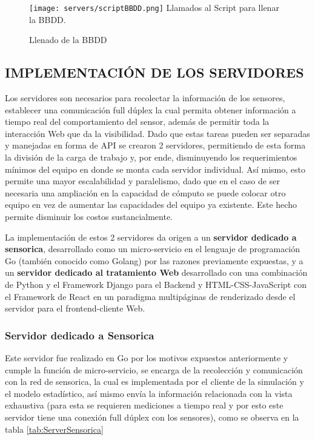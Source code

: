 	\begin{figure}[htb]
		\centering
        \caption{Llenado de la BBDD}
        \texttt{[image: servers/scriptBBDD.png]}
        Llamados al Script para llenar la BBDD.    \label{img:scriptBBDD}
	\end{figure}

\subsection{IMPLEMENTACIÓN DE LOS SERVIDORES}

    Los servidores son necesarios para recolectar la información de los sensores,
    establecer una comunicación full dúplex la cual permita obtener información
    a tiempo real del comportamiento del sensor, además de permitir toda la
    interacción Web que da la visibilidad. Dado que estas tareas pueden ser
    separadas y manejadas en forma de API se crearon 2 servidores, permitiendo
    de esta forma la división de la carga de trabajo y, por ende, disminuyendo los
    requerimientos mínimos del equipo en donde se monta cada servidor individual.
    Así mismo, esto permite una mayor escalabilidad y paralelismo, dado que en el
    caso de ser necesaria una ampliación en la capacidad de cómputo se puede colocar
    otro equipo en vez de aumentar las capacidades del equipo ya existente. Este
    hecho permite disminuir los costos sustancialmente.

    La implementación de estos 2 servidores da origen a un \textbf{servidor dedicado
    a sensorica}, desarrollado como un micro-servicio en el lenguaje de programación
    Go (también conocido como Golang) por las razones previamente expuestas, y
    a un \textbf{servidor dedicado al tratamiento Web} desarrollado con una
    combinación de Python y el Framework Django para el Backend y HTML-CSS-JavaScript
    con el Framework de React en un paradigma multipáginas de renderizado desde
    el servidor para el frontend-cliente Web.

    \subsubsection{Servidor dedicado a Sensorica}


    Este servidor fue realizado en Go por los motivos expuestos anteriormente y
    cumple la función de micro-servicio, se encarga de la recolección y comunicación
    con la red de sensorica, la cual es implementada por el cliente de la simulación
    y el modelo estadístico, así mismo envía la información relacionada con la
    vista exhaustiva (para esta se requieren mediciones a tiempo real y por esto
    este servidor tiene una conexión full dúplex con los sensores),
    como se observa en la tabla \ref{tab:ServerSensorica}

